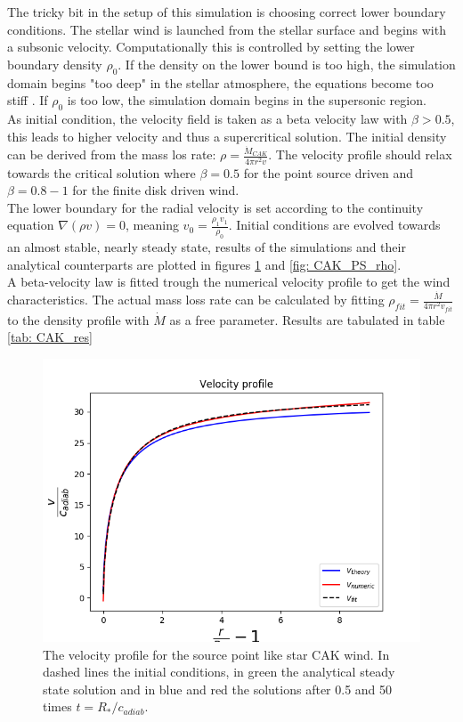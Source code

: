 The tricky bit in the setup of this simulation is choosing correct lower boundary conditions. The stellar wind is launched from the stellar surface and begins with a subsonic velocity. Computationally this is controlled by setting the lower boundary density $\rho_0$. If the density on the lower bound is too high, the simulation domain begins "too deep" in the stellar atmosphere, the equations become too stiff \citep{Sundqvist2013}. If $\rho_0$ is too low, the simulation domain begins in the supersonic region.\\

As initial condition, the velocity field is taken as a beta velocity law with $\beta > 0.5$, this leads to higher velocity and thus a supercritical solution. The initial density can be derived from the mass los rate: $\rho = \frac{\dot{M}_{CAK}}{4\pi r^2 v}$. The velocity profile should relax towards the critical solution where $\beta = 0.5$ for the point source driven and $\beta = 0.8-1$ \citep{Owocki2003} for the finite disk driven wind.\\

The lower boundary for the radial velocity is set according to the continuity equation $\nabla (\rho v) = 0$, meaning $v_0 = \frac{\rho_1 v_1}{\rho_0}$. Initial conditions are evolved towards an almost stable, nearly steady state, results of the simulations and their analytical counterparts are plotted in figures \ref{fig: CAK_PS_v} and \ref{fig: CAK_PS_rho}.\\

A beta-velocity law is fitted trough the numerical velocity profile to get the wind characteristics. The actual mass loss rate can be calculated by fitting $\rho_{fit} = \frac{\dot{M}}{4\pi r^2 v_{fit}}$ to the density profile with $\dot{M}$ as a free parameter. Results are tabulated in table \ref{tab: CAK_res}

\begin{figure}
\centering
\includegraphics[width = \textwidth]{CAK_velocity_profile.png}
\caption{The velocity profile for the source point like star CAK wind. In dashed lines the initial conditions, in green the analytical steady state solution and in blue and red the solutions after 0.5 and 50 times $t = R_*/c_{adiab}$.}
\label{fig: CAK_PS_v}
\end{figure}

